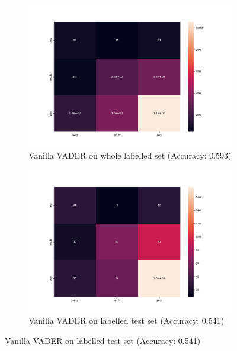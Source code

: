 \documentclass[11pt]{article}
\begin{document}

\begin{figure}[H]
     \centering
     \begin{subfigure}[b]{0.45\textwidth}
         \centering
         \includegraphics[width=\textwidth]{figures/confusion_matrix_vader_vanilla_acc_0593_full_data.png}
         \caption{Vanilla VADER on whole labelled set (Accuracy: 0.593)}
         \label{matrix_van_full}
     \end{subfigure}
     \hfill
     \begin{subfigure}[b]{0.45\textwidth}
         \centering
         \includegraphics[width=\textwidth]{figures/confusion_matrix_vader_vanilla_testset_0541.png}
         \caption{Vanilla VADER on labelled test set (Accuracy: 0.541)}
         \label{matrix_van_test}
     \end{subfigure} 

\end{figure}
\end{document}
